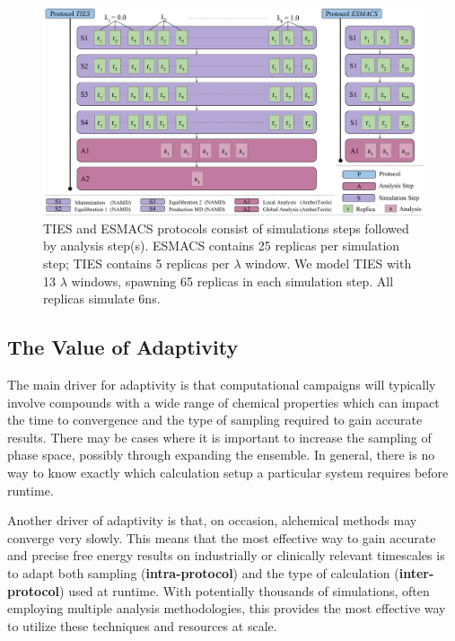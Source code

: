\begin{figure}
  \centering
  \includegraphics[width=\columnwidth]{figures/ties_esmacs_application_model.pdf}
  \caption{TIES and ESMACS protocols consist of simulations steps followed by
  analysis step(s). ESMACS contains 25 replicas per simulation step; TIES
  contains 5 replicas per $\lambda$ window. We model TIES with 13 $\lambda$
  windows, spawning 65 replicas in each simulation step. All replicas
  simulate 6ns.}\label{fig:ties_esmacs_application}
\up{}
\up{}
\end{figure}

\subsection{The Value of Adaptivity}\label{ssec:adapt_ties}

The main driver for adaptivity is that computational campaigns will typically
involve compounds with a wide range of chemical properties which can impact
the time to convergence and the type of sampling required to gain accurate
results. There may be cases where it is important to increase the sampling of
phase space, possibly through expanding the ensemble. In general, there is no
way to know exactly which calculation setup a particular system requires
before runtime.

Another driver of adaptivity is that, on occasion, alchemical methods may
converge very slowly. This means that the most effective way to gain accurate
and precise free energy results on industrially or clinically relevant
timescales is to adapt both sampling (\textbf{intra-protocol}) and the type
of calculation (\textbf{inter-protocol}) used at runtime. With potentially
thousands of simulations, often employing multiple analysis methodologies,
this provides the most effective way to utilize these techniques and
resources at scale.

